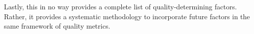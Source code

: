Lastly, this in no way provides a complete list of quality-determining factors. 
Rather, it provides a systematic methodology to incorporate future factors in the same framework of \vrvideo quality metrics.








